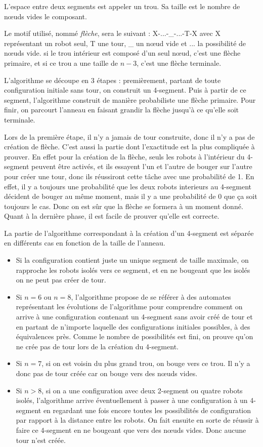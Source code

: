 \documentclass[11pt,letter]{../../pactole-git/tex/llncs} %
\begin{document}
L'espace entre deux segments est appeler un trou. Sa taille est le nombre de nœuds vides 
le composant. 

Le motif utilisé, nommé \emph{flèche}, sera le suivant :
X-...-\_-...-T-X avec X représentant un robot seul, T une tour, \_ un nœud vide et ... 
la possibilité de nœuds vide. si le trou intérieur est composé d'un seul nœud, c'est une 
flèche primaire, et si ce trou a une taille de $n-3$, c'est une flèche terminale.

L'algorithme se découpe en 3 étapes : premièrement, partant de toute configuration initiale 
sans tour, on construit un 4-segment. Puis à partir de ce segment, l'algorithme construit 
de manière probabiliste une flèche primaire. Pour finir, on parcourt l'anneau en faisant
grandir la flèche jusqu'à ce qu'elle soit terminale.

Lors de la première étape, il n'y a jamais de tour construite, donc il n'y a pas de 
création de flèche. C'est aussi la partie dont l'exactitude est la plus compliquée à prouver.
En effet pour la création de la flèche, seuls les robots à
l'intérieur du 4-segment peuvent être activés, et ils essayent l'un et l'autre de bouger
sur l'autre pour créer une tour, donc ils réussiront cette tâche avec une probabilité de 1.
En effet, il y a toujours une probabilité que les deux robots interieurs au 4-segment décident 
de bouger au même moment, mais il y a une probabilité de 0 que ça soit toujours le cas.
Donc on est sûr que la flèche se formera à un moment donné.
Quant à la dernière phase, il est facile de prouver qu'elle est correcte.

La partie de l'algorithme correspondant à la création d'un 4-segment est séparée en différents
cas en fonction de la taille de l'anneau.
\begin{itemize}
\item Si la configuration contient juste un unique segment de taille maximale, 
on rapproche les robots isolés vers ce segment,
et en ne bougeant que les isolés on ne peut pas créer de tour.
\item Si $n=6$ ou $n=8$, l'algorithme propose de se référer à des automates représentant 
les évolutions de l'algorithme pour comprendre comment on arrive à une configuration
contenant un 4-segment sans avoir créé de tour et en partant de n'importe laquelle des 
configurations initiales possibles, à des équivalences près. Comme le nombre de possibilités 
est fini, on prouve qu'on ne crée pas de tour lors de la création du 4-segment.
\item Si $n=7$, si on est voisin du plus grand trou, on bouge vers ce trou. Il n'y a donc 
pas de tour créée car on bouge vers des nœuds vides.
\item Si $n>8$, si on a une configuration avec deux 2-segment ou quatre robots isolés, 
l'algorithme arrive éventuellement à passer à une configuration à un 4-segment en regardant
une fois encore toutes les possibilités de configuration par rapport à la distance 
entre les robots. On fait ensuite en sorte de réussir à faire ce 4-segment en ne bougeant que
vers des nœuds vides. Donc aucune tour n'est créée.
\end{itemize}
\end{document}
